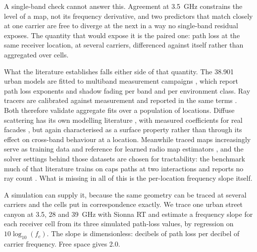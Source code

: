 \documentclass[conference]{IEEEtran}
\begin{document}
A single-band check cannot answer this. Agreement at \SI{3.5}{\giga\hertz}
constrains the level of a map, not its frequency derivative, and two
predictors that match closely at one carrier are free to diverge at the next
in a way no single-band residual exposes. The quantity that would expose it is
the paired one: path loss at the same receiver location, at several carriers,
differenced against itself rather than aggregated over cells.

What the literature establishes falls either side of that quantity. The 38.901
urban models \cite{3gpp38901} are fitted to multiband measurement campaigns
\cite{rappaport2013mmwave, sulyman2014pathloss}, which report path loss
exponents and shadow fading per band and per environment class. Ray tracers
are calibrated against measurement and reported in the same terms
\cite{ying2026nyuray}. Both therefore validate aggregate fits over a
population of locations.
Diffuse scattering has its own modelling literature
\cite{degliesposti2001diffuse, degliesposti2004advanced}, with measured
coefficients for real facades \cite{degliesposti2007measurement}, but again
characterised as a surface property rather than through its effect on
cross-band behaviour at a location. Meanwhile traced maps increasingly serve
as training data and reference for learned radio map estimators
\cite{feng2025radiomapsurvey, yapar2024challenge}, and the solver settings
behind those datasets are chosen for tractability: the benchmark much of that
literature trains on caps paths at two interactions and reports no ray count
\cite{yapar2024challenge}. What is missing in all of this is the per-location
frequency slope itself.

A simulation can supply it, because the same geometry can be traced at several
carriers and the cells put in correspondence exactly. We trace one urban
street canyon at \SI{3.5}{}, \SI{28}{} and \SI{39}{\giga\hertz} with Sionna RT
\cite{hoydis2023sionnart} and estimate a frequency slope for each receiver
cell from its three simulated path-loss values, by regression on
$10\log_{10}(f_c)$. The slope is dimensionless: decibels of path loss per
decibel of carrier frequency. Free space gives \num{2.0}.
\end{document}
